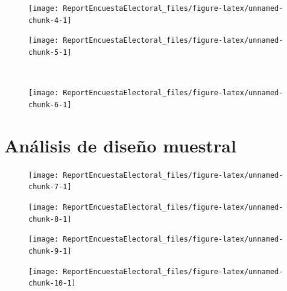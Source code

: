 \documentclass[10,a4paperpaper,]{article}
\begin{document}
\begin{figure}[!htb]
  \begin{minipage}{0.3\textwidth}
    \centering

\texttt{[image: ReportEncuestaElectoral\_files/figure-latex/unnamed-chunk-4-1]} 
  \end{minipage}\hfill
  \begin{minipage}{0.3\textwidth}
    \centering

\texttt{[image: ReportEncuestaElectoral\_files/figure-latex/unnamed-chunk-5-1]} 
  \end{minipage}
  \\
  \centering
  \begin{minipage}{0.3\textwidth}
    \centering

\texttt{[image: ReportEncuestaElectoral\_files/figure-latex/unnamed-chunk-6-1]} 
  \end{minipage}
\end{figure}

\newpage

\section{Análisis de diseño muestral}

\begin{figure}[!htb]
    \begin{minipage}{0.5\textwidth}
      \centering

\texttt{[image: ReportEncuestaElectoral\_files/figure-latex/unnamed-chunk-7-1]} 
    \end{minipage}\hfill
    \begin{minipage}{0.5\textwidth}
      \centering

\texttt{[image: ReportEncuestaElectoral\_files/figure-latex/unnamed-chunk-8-1]} 
    \end{minipage}
\end{figure}

\begin{figure}[!htb]
  \begin{minipage}{0.3\textwidth}
    \centering

\texttt{[image: ReportEncuestaElectoral\_files/figure-latex/unnamed-chunk-9-1]} 
    \end{minipage}\hfill
  \begin{minipage}{0.3\textwidth}
    \centering

\texttt{[image: ReportEncuestaElectoral\_files/figure-latex/unnamed-chunk-10-1]} 
  \end{minipage}
\end{figure}
\end{document}
